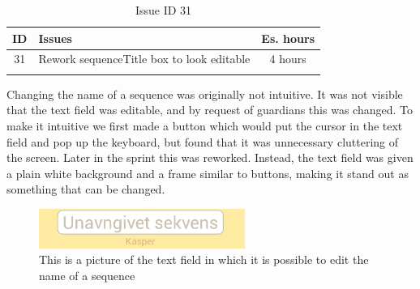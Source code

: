 \begin{longtable} { | c | p{12cm} | c | } 
\hline
	ID 	&	Issues	&		 Es. hours \\\hline
	31 	&	Rework sequenceTitle box to look editable	&	4 hours \\\hline
\caption{Issue ID 31}
\label{tab:spr2_reworktitlebox}
\end{longtable}

Changing the name of a sequence was originally not intuitive. It was not visible that the text field was editable, and by request of guardians this was changed. To make it intuitive we first made a button which would put the cursor in the text field and pop up the keyboard, but found that it was unnecessary cluttering of the screen. Later in the sprint this was reworked. Instead, the text field was given a plain white background and a frame similar to buttons, making it stand out as something that can be changed.

\begin{figure} [h!]
\centering
\includegraphics[width=0.6\textwidth]{Pics/Sprint2/editName/editTheName.png}
\caption{This is a picture of the text field in which it is possible to edit the name of a sequence}
\label{fig:new_editName}
\end{figure}
